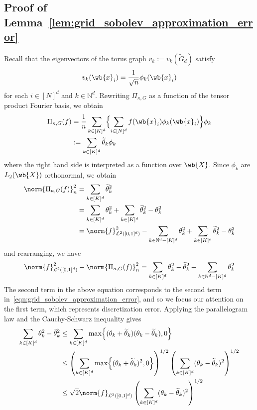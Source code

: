 \documentclass{article}
\newcommand{\1}{\mathbf{1}}
\newcommand{\Leb}{\mathcal{L}}
\newcommand{\wt}[1]{\widetilde{#1}}
\theoremstyle{alden}
\theoremstyle{aldenthm}
\theoremstyle{definition}
\theoremstyle{remark}
\begin{document}
\subsection{Proof of Lemma~\ref{lem:grid_sobolev_approximation_error}}
Recall that the eigenvectors of the torus graph $v_k := v_k(\wt{G}_d)$ satisfy
\begin{equation*}
v_{k}(\wb{x}_i) = \frac{1}{\sqrt{n}} \phi_{k}(\wb{x}_i)
\end{equation*}
for each $i \in [N]^d$ and $k \in \mathbb{N}^d$. Rewriting $\Pi_{\kappa,G}$ as a function of the tensor product Fourier basis, we obtain
\begin{align*}
\Pi_{\kappa,G}(f) & = \frac{1}{n} \sum_{k \in [K]^d} \Bigl\{\sum_{i \in [N]^d} f(\wb{x}_i) \phi_k(\wb{x}_i)\Bigr\} \phi_k \\
& :=  \sum_{k \in [K]^d} \wt{\theta}_k \phi_k
\end{align*}
where the right hand side is interpreted as a function over $\wb{X}$. Since $\phi_k$ are $L_2(\wb{X})$ orthonormal, we obtain
\begin{align*}
\norm{\Pi_{\kappa,G}(f)}_n^2 & = \sum_{k \in [K]^d} \wt{\theta}_k^2 \\ 
& = \sum_{k \in [K]^d} {\theta}_k^2 + \sum_{k \in [K]^d} \wt{\theta}_k^2 - \theta_k^2 \\
& = \norm{f}_{\Leb^2([0,1]^d)}^2 - \sum_{k \in \mathbb{N}^d - [K]^d} \theta_k^2 + \sum_{k \in [K]^d} \wt{\theta}_k^2 - \theta_k^2
\end{align*}
and rearranging, we have
\begin{equation*}
\norm{f}_{\Leb^2([0,1]^d)}^2 - \norm{\Pi_{\kappa,G}(f)}_n^2 = \sum_{k \in [K]^d} \theta_k^2 - \wt{\theta}_k^2 + \sum_{k \in \mathbb{N}^d - [K]^d} \theta_k^2
\end{equation*}
The second term in the above equation corresponds to the second term in~\eqref{eqn:grid_sobolev_approximation_error}, and so we focus our attention on the first term, which represents discretization error. Applying the parallelogram law and the Cauchy-Schwarz inequality gives
\begin{equation}
\label{eqn:grid_sobolev_approximation_error_pf2}
\begin{aligned}
\sum_{k \in [K]^d} \theta_k^2 - \wt{\theta}_k^2 & \leq \sum_{k \in [K]^d} \max\Bigl\{(\theta_k + \wt{\theta}_k)(\theta_k - \wt{\theta}_k),0\Bigr\} \\
& \leq \left(\sum_{k \in [K]^d} \max\Bigl\{(\theta_k + \wt{\theta}_k)^2,0\Bigr\}\right)^{1/2} \left(\sum_{k \in [K]^d} (\theta_k - \wt{\theta}_k)^2\right)^{1/2} \\
& \leq \sqrt{2} \norm{f}_{\Leb^2([0,1]^d)} \left(\sum_{k \in [K]^d} (\theta_k - \wt{\theta}_k)^2\right)^{1/2}
\end{aligned}
\end{equation}
\end{document}

